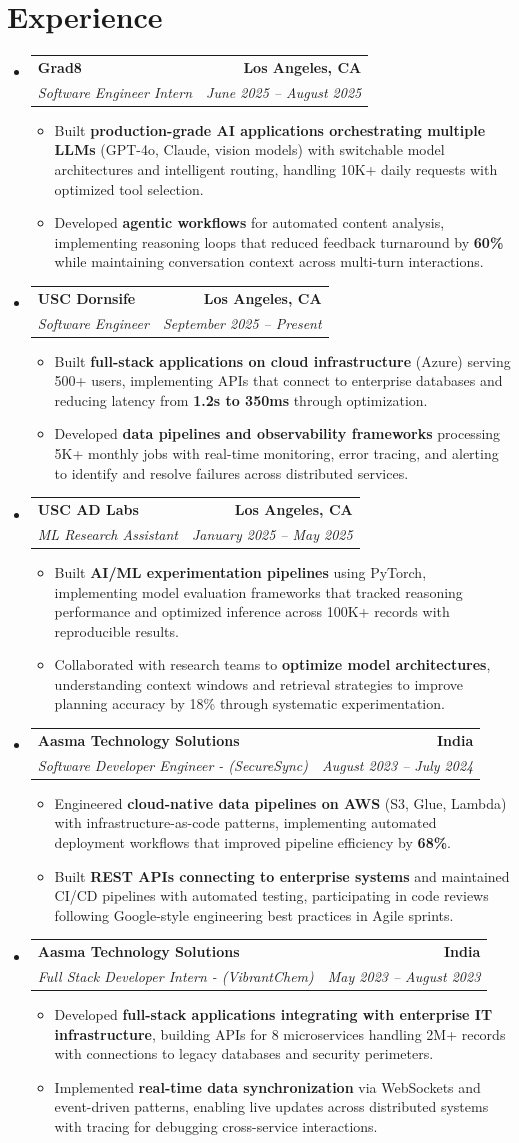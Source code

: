 \documentclass[letterpaper,10pt]{article}
\makeatletter
\newcommand{\resumeItem}[1]{\item\small{{#1 \vspace{-2pt}}}}
\newcommand{\resumeSubheading}[4]{\vspace{-1pt}\item\begin{tabular*}{1.0\textwidth}[t]{l@{\extracolsep{\fill}}r}\textbf{#1} & \textbf{\small #2} \\\textit{\small#3} & \textit{\small #4} \\\end{tabular*}\vspace{-2pt}}
\newcommand{\resumeSubHeadingListStart}{\begin{itemize}[leftmargin=0.0in, label={}]}
\newcommand{\resumeSubHeadingListEnd}{\end{itemize}}
\newcommand{\resumeItemListStart}{\begin{itemize}[leftmargin=0.15in,label=\textbullet,itemsep=2pt,topsep=0pt,parsep=0pt,partopsep=0pt]}
\newcommand{\resumeItemListEnd}{\end{itemize}\vspace{-4pt}}
\makeatother
\begin{document}
\section{Experience}
\resumeSubHeadingListStart
\resumeSubheading{Grad8}{Los Angeles, CA}{Software Engineer Intern}{June 2025 -- August 2025}
\resumeItemListStart
\resumeItem{Built \textbf{production-grade AI applications orchestrating multiple LLMs} (GPT-4o, Claude, vision models) with switchable model architectures and intelligent routing, handling 10K+ daily requests with optimized tool selection.}
\resumeItem{Developed \textbf{agentic workflows} for automated content analysis, implementing reasoning loops that reduced feedback turnaround by \textbf{60\%} while maintaining conversation context across multi-turn interactions.}
\resumeItemListEnd
\resumeSubheading{USC Dornsife}{Los Angeles, CA}{Software Engineer}{September 2025 -- Present}
\resumeItemListStart
\resumeItem{Built \textbf{full-stack applications on cloud infrastructure} (Azure) serving 500+ users, implementing APIs that connect to enterprise databases and reducing latency from \textbf{1.2s to 350ms} through optimization.}
\resumeItem{Developed \textbf{data pipelines and observability frameworks} processing 5K+ monthly jobs with real-time monitoring, error tracing, and alerting to identify and resolve failures across distributed services.}
\resumeItemListEnd
\resumeSubheading{USC AD Labs}{Los Angeles, CA}{ML Research Assistant}{January 2025 -- May 2025}
\resumeItemListStart
\resumeItem{Built \textbf{AI/ML experimentation pipelines} using PyTorch, implementing model evaluation frameworks that tracked reasoning performance and optimized inference across 100K+ records with reproducible results.}
\resumeItem{Collaborated with research teams to \textbf{optimize model architectures}, understanding context windows and retrieval strategies to improve planning accuracy by 18\% through systematic experimentation.}
\resumeItemListEnd
\resumeSubheading{Aasma Technology Solutions}{India}{Software Developer Engineer - (SecureSync)}{August 2023 -- July 2024}
\resumeItemListStart
\resumeItem{Engineered \textbf{cloud-native data pipelines on AWS} (S3, Glue, Lambda) with infrastructure-as-code patterns, implementing automated deployment workflows that improved pipeline efficiency by \textbf{68\%}.}
\resumeItem{Built \textbf{REST APIs connecting to enterprise systems} and maintained CI/CD pipelines with automated testing, participating in code reviews following Google-style engineering best practices in Agile sprints.}
\resumeItemListEnd
\resumeSubheading{Aasma Technology Solutions}{India}{Full Stack Developer Intern - (VibrantChem)}{May 2023 -- August 2023}
\resumeItemListStart
\resumeItem{Developed \textbf{full-stack applications integrating with enterprise IT infrastructure}, building APIs for 8 microservices handling 2M+ records with connections to legacy databases and security perimeters.}
\resumeItem{Implemented \textbf{real-time data synchronization} via WebSockets and event-driven patterns, enabling live updates across distributed systems with tracing for debugging cross-service interactions.}
\resumeItemListEnd
\resumeSubHeadingListEnd
\vspace{-14pt}
\end{document}
